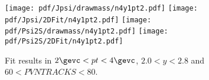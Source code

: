 \begin{figure}[H]
\begin{center}
\texttt{[image: pdf/Jpsi/drawmass/n4y1pt2.pdf]}
\texttt{[image: pdf/Jpsi/2DFit/n4y1pt2.pdf]}
\vspace*{-0.5cm}
\texttt{[image: pdf/Psi2S/drawmass/n4y1pt2.pdf]}
\texttt{[image: pdf/Psi2S/2DFit/n4y1pt2.pdf]}
\vspace*{-0.5cm}
\end{center}
\caption{Fit results in $2\gevc<pt<4\gevc$, $2.0<y<2.8$ and $60<PVNTRACKS<80$.}
\label{Fitn4y1pt2}
\end{figure}
